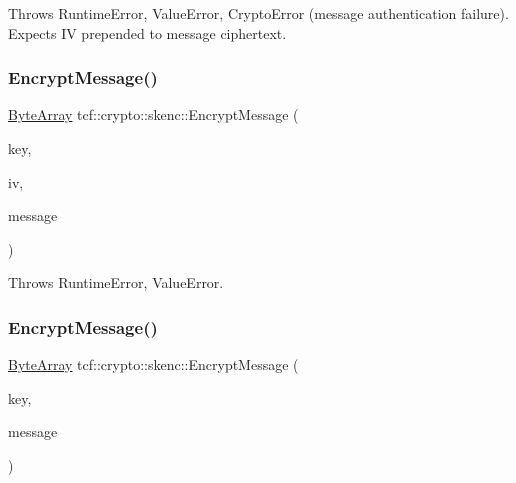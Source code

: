 Throws Runtime\+Error, Value\+Error, Crypto\+Error (message authentication failure). Expects IV prepended to message ciphertext. \mbox{\label{namespacetcf_1_1crypto_1_1skenc_a12c94c127224bfa602b80205ff93bae6}} 
\subsubsection{\texorpdfstring{Encrypt\+Message()}{EncryptMessage()}\hspace{0.1cm}{\footnotesize\ttfamily [1/2]}}
{\footnotesize\ttfamily \hyperlink{types_8h_a35da937e2331acce98d47f44892f4a76}{Byte\+Array} tcf\+::crypto\+::skenc\+::\+Encrypt\+Message (\begin{DoxyParamCaption}\item[{const \hyperlink{types_8h_a35da937e2331acce98d47f44892f4a76}{Byte\+Array} \&}]{key,  }\item[{const \hyperlink{types_8h_a35da937e2331acce98d47f44892f4a76}{Byte\+Array} \&}]{iv,  }\item[{const \hyperlink{types_8h_a35da937e2331acce98d47f44892f4a76}{Byte\+Array} \&}]{message }\end{DoxyParamCaption})}

Throws Runtime\+Error, Value\+Error. \mbox{\label{namespacetcf_1_1crypto_1_1skenc_a1672f183497e16c33daf8453eb2b5b4a}} 
\subsubsection{\texorpdfstring{Encrypt\+Message()}{EncryptMessage()}\hspace{0.1cm}{\footnotesize\ttfamily [2/2]}}
{\footnotesize\ttfamily \hyperlink{types_8h_a35da937e2331acce98d47f44892f4a76}{Byte\+Array} tcf\+::crypto\+::skenc\+::\+Encrypt\+Message (\begin{DoxyParamCaption}\item[{const \hyperlink{types_8h_a35da937e2331acce98d47f44892f4a76}{Byte\+Array} \&}]{key,  }\item[{const \hyperlink{types_8h_a35da937e2331acce98d47f44892f4a76}{Byte\+Array} \&}]{message }\end{DoxyParamCaption})}

